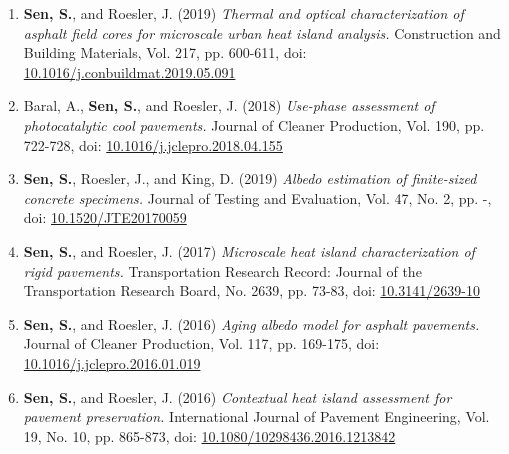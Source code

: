\documentclass[12pt]{article}
\begin{document}
\begin{enumerate}[label=(J\arabic*)]
		\item \textbf{Sen, S.}, and Roesler, J. (2019) \textit{Thermal and optical characterization of asphalt field cores for microscale urban heat island analysis.}  Construction and Building Materials, Vol. 217, pp. 600-611, doi: \href{https://doi.org/10.1016/j.conbuildmat.2019.05.091}{10.1016/j.conbuildmat.2019.05.091}
	\item Baral, A., \textbf{Sen, S.}, and Roesler, J. (2018) \textit{Use-phase assessment of photocatalytic cool pavements.}  Journal of Cleaner Production, Vol. 190, pp. 722-728, doi: \href{https://doi.org/10.1016/j.jclepro.2018.04.155}{10.1016/j.jclepro.2018.04.155}
	\item \textbf{Sen, S.}, Roesler, J., and King, D. (2019) \textit{Albedo estimation of finite-sized concrete specimens.} Journal of Testing and Evaluation, Vol. 47, No. 2, pp. -, doi: \href{https://doi.org/10.1520/JTE20170059}{10.1520/JTE20170059}
	\item \textbf{Sen, S.}, and Roesler, J. (2017) \textit{Microscale heat island characterization of rigid pavements.} Transportation Research Record: Journal of the Transportation Research Board, No. 2639, pp. 73-83, doi: \href{http://dx.doi.org/10.3141/2639-10}{10.3141/2639-10}
	\item \textbf{Sen, S.}, and Roesler, J. (2016) \textit{Aging albedo model for asphalt pavements.} Journal of Cleaner Production, Vol. 117, pp. 169-175, doi: \href{http://dx.doi.org/10.1016/j.jclepro.2016.01.019}{10.1016/j.jclepro.2016.01.019}
	\item \textbf{Sen, S.}, and Roesler, J. (2016) \textit{Contextual heat island assessment for pavement preservation.} International Journal of Pavement Engineering, Vol. 19, No. 10, pp. 865-873, doi: \href{https://www.tandfonline.com/doi/full/10.1080/10298436.2016.1213842}{10.1080/10298436.2016.1213842}
\end{enumerate}
\end{document}

